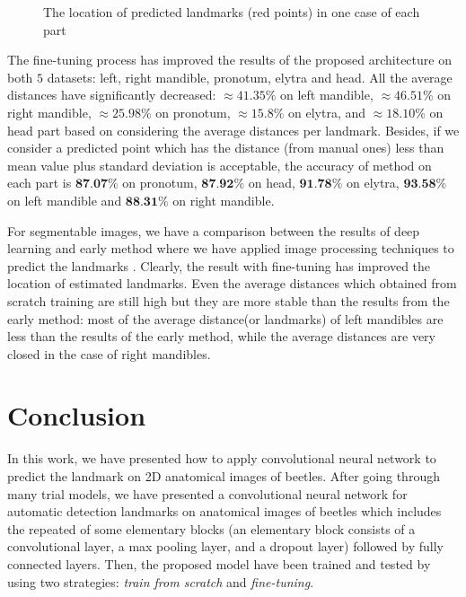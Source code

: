\documentclass[review]{elsarticle}
\begin{document}
\begin{figure}[htbp]
    \caption{The location of predicted landmarks (red points) in one case of each part }
    \label{figpdl}
\end{figure}

The fine-tuning process has improved the results of the proposed architecture on both $5$ datasets: left, right mandible, pronotum, elytra and head. All the average distances have significantly decreased: $\approx 41.35\%$ on left mandible, $\approx 46.51\%$ on right mandible, $\approx 25.98\%$ on pronotum, $\approx 15.8\%$ on elytra, and $\approx 18.10\%$  on head part based on considering the average distances per landmark. Besides, if we consider a predicted point which has the distance (from manual ones) less than mean value plus standard deviation is acceptable, the accuracy of method on each part is $\textbf{87.07\%}$ on pronotum, $\textbf{87.92\%}$ on head, $\textbf{91.78\%}$ on elytra, $\textbf{93.58\%}$ on left mandible and $\textbf{88.31\%}$ on right mandible.

For segmentable images, we have a comparison between the results of deep learning and early method where we have applied image processing techniques to predict the landmarks \cite{le2017maelab}. Clearly, the result with fine-tuning has improved the location of estimated landmarks. Even the average distances which obtained from scratch training are still high but they are more stable than the results from the early method: most of the average distance(or landmarks) of left mandibles are less than the results of the early method, while the average distances are very closed in the case of right mandibles.
\section{Conclusion}
\label{sconclusion}
In this work, we have presented how to apply convolutional neural network to predict the landmark on 2D anatomical images of beetles. After going through many trial models, we have presented a convolutional neural network for automatic detection landmarks on anatomical images of beetles which includes the repeated of some elementary blocks (an elementary block consists of a convolutional layer, a max pooling layer, and a dropout layer) followed by fully connected layers. Then, the proposed model have been trained and tested by using two strategies: \textit{train from scratch} and \textit{fine-tuning}. 
\end{document}

